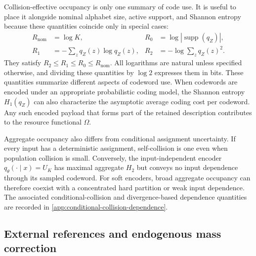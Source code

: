 Collision-effective occupancy is only one summary of code use.
It is useful to place it alongside nominal alphabet size, active support, and Shannon entropy because these quantities coincide only in special cases:
\begin{equation}
\begin{aligned}
R_{\mathrm{nom}}&=\log K,&
R_0&=\log|\operatorname{supp}(q_Z)|,\\
R_1&=-\sum_zq_Z(z)\log q_Z(z),&
R_2&=-\log\sum_zq_Z(z)^2.
\end{aligned}
\label{eq:finite-state-rate-hierarchy}
\end{equation}
They satisfy $R_2\le R_1\le R_0\le R_{\mathrm{nom}}$.
All logarithms are natural unless specified otherwise, and dividing these quantities by $\log 2$ expresses them in bits.
These quantities summarize different aspects of codeword use.
When codewords are encoded under an appropriate probabilistic coding model, the Shannon entropy $H_1(q_Z)$ can also characterize the asymptotic average coding cost per codeword.
Any such encoded payload that forms part of the retained description contributes to the resource functional $\Omega$.

Aggregate occupancy also differs from conditional assignment uncertainty.
If every input has a deterministic assignment, self-collision is one even when population collision is small.
Conversely, the input-independent encoder $q_\theta(\cdot\mid x)=U_K$ has maximal aggregate $H_2$ but conveys no input dependence through its sampled codeword.
For soft encoders, broad aggregate occupancy can therefore coexist with a concentrated hard partition or weak input dependence.
The associated conditional-collision and divergence-based dependence quantities are recorded in \ref{app:conditional-collision-dependence}.

\subsection{External references and endogenous mass correction}

